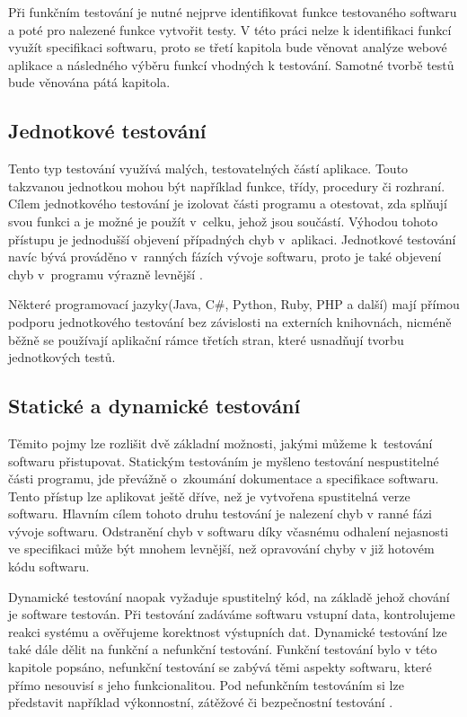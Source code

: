 \documentclass[
    color,   %
	table,   %
    twoside, %
]{fithesis3}
\begin{document}
Při funkčním testování je nutné nejprve identifikovat funkce testovaného softwaru a poté pro nalezené funkce vytvořit testy. V této práci nelze k identifikaci funkcí využít specifikaci softwaru, proto se třetí kapitola bude věnovat analýze webové aplikace a následného výběru funkcí vhodných k testování. Samotné tvorbě testů bude věnována pátá kapitola.

\subsection{Jednotkové testování}
Tento typ testování využívá malých, testovatelných částí aplikace. Touto takzvanou jednotkou mohou být například funkce, třídy, procedury či rozhraní. Cílem jednotkového testování je izolovat části programu a otestovat, zda splňují svou funkci a je možné je použít v~celku, jehož jsou součástí. Výhodou tohoto přístupu je jednodušší objevení případných chyb v~aplikaci. Jednotkové testování navíc bývá prováděno v~ranných fázích vývoje softwaru, proto je také objevení chyb v~programu výrazně levnější \cite{UnitISTQB}. 

Některé programovací jazyky(Java, C\#, Python, Ruby, PHP a další) mají přímou podporu jednotkového testování bez závislosti na externích knihovnách, nicméně běžně se používají aplikační rámce třetích stran, které usnadňují tvorbu jednotkových testů.

\subsection{Statické a dynamické testování}
Těmito pojmy lze rozlišit dvě základní možnosti, jakými můžeme k~testování softwaru přistupovat. Statickým testováním je myšleno testování nespustitelné části programu, jde převážně o~zkoumání dokumentace a specifikace softwaru. Tento přístup lze aplikovat ještě dříve, než je vytvořena spustitelná verze softwaru\cite{Patton}. Hlavním cílem tohoto druhu testování je nalezení chyb v ranné fázi vývoje softwaru. Odstranění chyb v softwaru díky včasnému odhalení nejasnosti ve specifikaci může být mnohem levnější, než opravování chyby v již hotovém kódu softwaru.

Dynamické testování naopak vyžaduje spustitelný kód, na základě jehož chování je software testován. Při testování zadáváme softwaru vstupní data, kontrolujeme reakci systému a ověřujeme korektnost výstupních dat. Dynamické testování lze také dále dělit na funkční a nefunkční testování. Funkční testování bylo v této kapitole popsáno, nefunkční testování se zabývá těmi aspekty softwaru, které přímo nesouvisí s jeho funkcionalitou. Pod nefunkčním testováním si lze představit například výkonnostní, zátěžové či bezpečnostní testování \cite{Guru99}.
\end{document}
